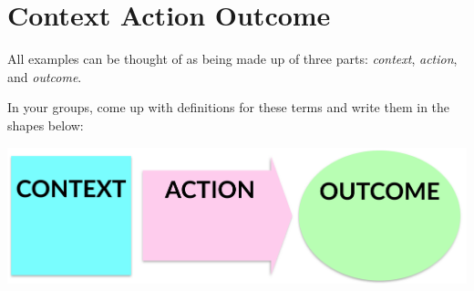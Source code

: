\chapter*{Context Action Outcome}

All examples can be thought of as being made up of three parts: \emph{context}, \emph{action}, and \emph{outcome}.

In your groups, come up with definitions for these terms and write them in the shapes below:

\begin{center}
    \includegraphics[width=\textwidth, keepaspectratio]{images/context-action-outcome}
\end{center}



